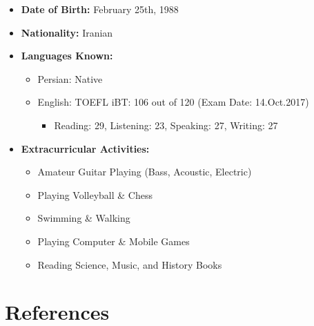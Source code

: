 \documentclass{cv}
\begin{document}
\begin{itemize}

\item
\textbf{Date of Birth:}
February 25th, 1988


\item
{\bf Nationality:}
Iranian

\item
\textbf{Languages Known:}
\begin{itemize}

\item
Persian: Native

\item
English: 
TOEFL iBT: 106 out of 120 
(Exam Date: 14.Oct.2017)
\begin{itemize}

\item
Reading: 29, 
Listening: 23, 
Speaking: 27,
Writing: 27 
\end{itemize}
\end{itemize}

\item
\textbf{Extracurricular Activities:}

\begin{itemize}
\item
Amateur Guitar Playing (Bass, Acoustic, Electric)
\item
Playing Volleyball \& Chess
\item
Swimming \& Walking
\item
Playing Computer \& Mobile Games
\item
Reading Science, Music, and History Books
\end{itemize} 


\end{itemize}


\section{References}
\end{document}

